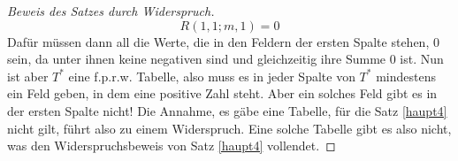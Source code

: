 \begin{proof}[Beweis des Satzes durch Widerspruch]
    \[
    R(1, 1; m, 1)= 0
    \]
    Dafür müssen dann all die Werte, die in den Feldern der ersten Spalte stehen, 0 sein, da unter ihnen keine 
    negativen sind und gleichzeitig ihre Summe 0 ist. Nun ist aber $T^*$ eine f.p.r.w. Tabelle, also muss es in jeder 
    Spalte von $T^*$ mindestens ein Feld geben, in dem eine positive Zahl steht. Aber ein solches Feld gibt es in 
    der ersten Spalte nicht! Die Annahme, es gäbe eine Tabelle, für die Satz \ref{haupt4} nicht gilt, führt also zu 
    einem Widerspruch. Eine solche Tabelle gibt es also nicht, was den Widerspruchsbeweis von Satz \ref{haupt4} vollendet.
    \renewcommand{\qedsymbol}{$\blacksquare$}
\end{proof}